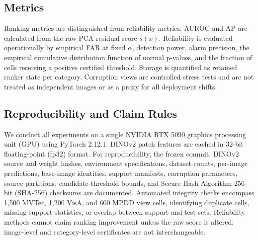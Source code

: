 \subsection{Metrics}
Ranking metrics are distinguished from reliability metrics. AUROC and AP are calculated from the raw PCA residual score $s(x)$. Reliability is evaluated operationally by empirical FAR at fixed $\alpha$, detection power, alarm precision, the empirical cumulative distribution function of normal p-values, and the fraction of cells receiving a positive certified threshold. Storage is quantified as retained ranker state per category. Corruption views are controlled stress tests and are not treated as independent images or as a proxy for all deployment shifts.

\subsection{Reproducibility and Claim Rules}
We conduct all experiments on a single NVIDIA RTX 5090 graphics processing unit (GPU) using PyTorch 2.12.1. DINOv2 patch features are cached in 32-bit floating-point (fp32) format. For reproducibility, the frozen commit, DINOv2 source and weight hashes, environment specifications, dataset counts, per-image predictions, base-image identities, support manifests, corruption parameters, source partitions, candidate-threshold bounds, and Secure Hash Algorithm 256-bit (SHA-256) checksums are documented. Automated integrity checks encompass 1,500 MVTec, 1,200 VisA, and 600 MPDD view cells, identifying duplicate cells, missing support statistics, or overlap between support and test sets. Reliability methods cannot claim ranking improvement unless the raw score is altered; image-level and category-level certificates are not interchangeable.
